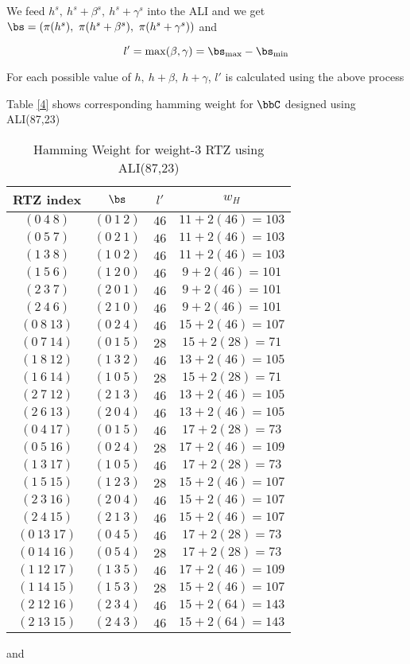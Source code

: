 \documentclass[11pt, oneside, dvipdfmx]{book}
\begin{document}
 We feed $h^s,~h^s+\beta^s,~h^s+\gamma^s$ into the ALI and we get $\bs=(\pi(h^s),~\pi(h^s+\beta^s),~\pi(h^s+\gamma^s))$ and 
 
 $$l'=\max(\beta,\gamma)= \bs_{\max}-\bs_{\min}$$
 
 For each possible value of $h,~h+\beta,~h+\gamma$, $l'$ is calculated using the above process

Table \ref{4}  shows corresponding hamming weight for $\bbC$ designed using ALI(87,23)
\begin{table}[h!]
\centering
\begin{tabular}{||c |c  | c |c |} 
 \hline
 RTZ index & $ \bs$ & $ l'$ & $w_H$\\
 \hline
 $(0~4~8)$ & $(0~1~2)$& $46$ & $11+2(46)=103$\\
 \hline
 $(0~5~7)$ & $(0~2~1)$&  $46$  &$11+2(46)=103$\\
 \hline
 $(1~3~8) $ & $(1~0~2)$&  $46$  & $11+2(46)=103$\\
 \hline
 $(1~5~6) $ & $(1~2~0)$ &  $46$  & $9+2(46)=101$\\
 \hline
 $(2~3~7)$ & $(2~0~1)$ & $46$  & $9+2(46)=101$\\
 \hline
 $(2~4~6)$ & $(2~1~0)$ & $46$  & $9+2(46)=101$\\
 \hline\hline
 $(0~8~13)$ & $(0~2~4)$& $46$ & $15+2(46)=107$\\
 \hline
 $(0~7~14)$ & $(0~1~5)$&  $28$  &$15+2(28)=71$\\
 \hline
 $(1~8~12) $ & $(1~3~2)$&  $46$  & $13+2(46)=105$\\
 \hline
 $(1~6~14) $ & $(1~0~5)$ &  $28$  & $15+2(28)=71$\\
 \hline
 $(2~7~12)$ & $(2~1~3)$ & $46$  & $13+2(46)=105$\\
 \hline
 $(2~6~13)$ & $(2~0~4)$ & $46$  & $13+2(46)=105$\\
 \hline\hline
 $(0~4~17)$ & $(0~1~5)$& $46$ & $17+2(28)=73$\\
 \hline
 $(0~5~16)$ & $(0~2~4)$&  $28$  &$17+2(46)=109$\\
 \hline
 $(1~3~17) $ & $(1~0~5)$&  $46$  & $17+2(28)=73$\\
 \hline
 $(1~5~15) $ & $(1~2~3)$ &  $28$  & $15+2(46)=107$\\
 \hline
 $(2~3~16)$ & $(2~0~4)$ & $46$  & $15+2(46)=107$\\
 \hline
 $(2~4~15)$ & $(2~1~3)$ & $46$  & $15+2(46)=107$\\
 \hline\hline
 $(0~13~17)$ & $(0~4~5)$& $46$ & $17+2(28)=73$\\
 \hline
 $(0~14~16)$ & $(0~5~4)$&  $28$  &$17+2(28)=73$\\
 \hline
 $(1~12~17) $ & $(1~3~5)$&  $46$  & $17+2(46)=109$\\
 \hline
 $(1~14~15) $ & $(1~5~3)$ &  $28$  & $15+2(46)=107$\\
 \hline
 $(2~12~16)$ & $(2~3~4)$ & $46$  & $15+2(64)=143$\\
 \hline
 $(2~13~15)$ & $(2~4~3)$ & $46$  & $15+2(64)=143$\\
 \hline\hline
\end{tabular}
\caption{Hamming Weight for weight-$3$ RTZ using ALI(87,23)} and
\label{tb4}
\end{table}
\end{document}
